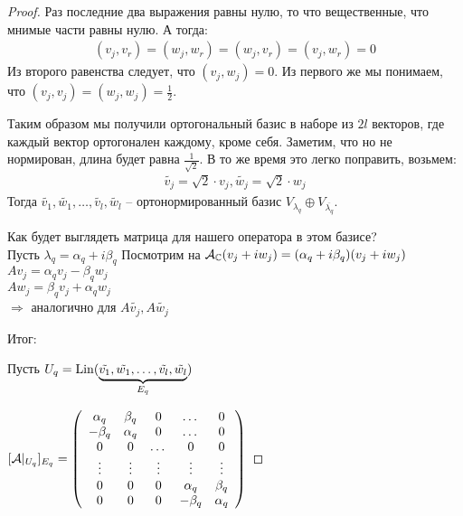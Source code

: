 \begin{theorem}
\begin{proof}
    Раз последние два выражения равны нулю, то что вещественные, что мнимые части равны нулю. А тогда:
    \begin{gather*}
        (v_j, v_r) = (w_j, w_r) = (w_j, v_r) = (v_j, w_r) = 0
    \end{gather*}
    Из второго равенства следует, что $(v_j, w_j) = 0$.
    Из первого же мы понимаем, что $(v_j, v_j) = (w_j, w_j) = \frac{1}{2}$.

    Таким образом мы получили ортогональный базис в наборе из $2l$ векторов, где каждый вектор ортогонален каждому, кроме себя. Заметим, что но не нормирован, длина будет равна $\frac{1}{\sqrt{2}}$. В то же время это легко поправить, возьмем:
    \begin{gather*}
        \widetilde{v_j} = \sqrt{2} \cdot v_j, \widetilde{w_j} = \sqrt{2} \cdot w_j
    \end{gather*}
    Тогда $\widetilde{v_1}, \widetilde{w_1}, \dots, \widetilde{v_l}, \widetilde{w_l}$ -- ортонормированный базис $V_{\lambda_q} \oplus V_{\overline{\lambda_{q}}}$.

    Как будет выглядеть матрица для нашего оператора в этом базисе? \\
    Пусть $\lambda_q = \alpha_q + i \beta_q$
    Посмотрим на $\mathcal{A}_{\mathbb{C}}(v_j + iw_j) = (\alpha_q + i \beta_q) (v_j + iw_j)$ \\
    $Av_j = \alpha_q v_j -  \beta_q w_j$ \\
    $Aw_j = \beta_q v_j + \alpha_q w_j$ \\
    $\Longrightarrow $ аналогично для $A\tilde{v_j}, A\tilde{w_j}$


    Итог: 

    Пусть $U_q = \operatorname{Lin} (\underbrace{\tilde{v_1}, \tilde{w_1}, \dots, \tilde{v_l}, \tilde{w_l}}_{\text{$ E_q $}} )$
    
    $[\mathcal{A} |_{U_q}]_{E_q} = \left(\begin{array}{ccccc}
    \alpha_q & \beta_q & 0 & \dots & 0 \\ 
    -\beta_q & \alpha_q & 0 & \dots & 0 \\ 
    0 & 0 & \dots & 0 & 0 \\ 
    \vdots & \vdots & \vdots & \vdots & \vdots \\
    0 & 0 & 0 & \alpha_q & \beta_q \\ 
    0 & 0 & 0 & -\beta_q & \alpha_q
    \end{array}\right)$
\end{proof} 
\end{theorem}


